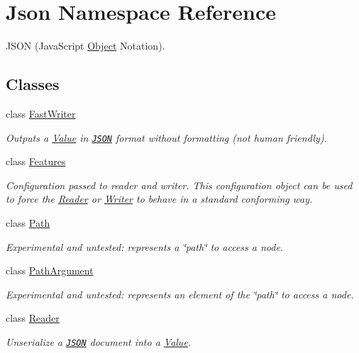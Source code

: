 \hypertarget{namespace_json}{\section{Json Namespace Reference}
\label{namespace_json}
}


J\+S\+O\+N (Java\+Script \hyperlink{class_object}{Object} Notation).  


\subsection*{Classes}
\begin{DoxyCompactItemize}
\item 
class \hyperlink{class_json_1_1_fast_writer}{Fast\+Writer}
\begin{DoxyCompactList}\small\item\em Outputs a \hyperlink{class_json_1_1_value}{Value} in \href{http://www.json.org}{\tt J\+S\+O\+N} format without formatting (not human friendly). \end{DoxyCompactList}\item 
class \hyperlink{class_json_1_1_features}{Features}
\begin{DoxyCompactList}\small\item\em Configuration passed to reader and writer. This configuration object can be used to force the \hyperlink{class_json_1_1_reader}{Reader} or \hyperlink{class_json_1_1_writer}{Writer} to behave in a standard conforming way. \end{DoxyCompactList}\item 
class \hyperlink{class_json_1_1_path}{Path}
\begin{DoxyCompactList}\small\item\em Experimental and untested\+: represents a \char`\"{}path\char`\"{} to access a node. \end{DoxyCompactList}\item 
class \hyperlink{class_json_1_1_path_argument}{Path\+Argument}
\begin{DoxyCompactList}\small\item\em Experimental and untested\+: represents an element of the \char`\"{}path\char`\"{} to access a node. \end{DoxyCompactList}\item 
class \hyperlink{class_json_1_1_reader}{Reader}
\begin{DoxyCompactList}\small\item\em Unserialize a \href{http://www.json.org}{\tt J\+S\+O\+N} document into a \hyperlink{class_json_1_1_value}{Value}. \end{DoxyCompactList}\item 

\end{DoxyCompactItemize}

